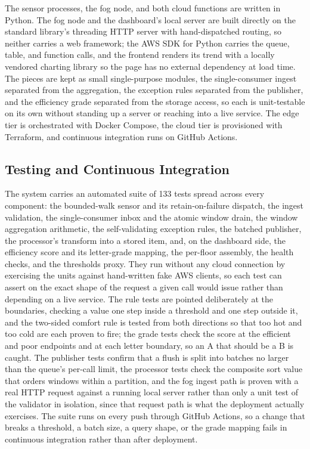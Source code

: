 \documentclass[conference]{IEEEtran}
\begin{document}
The sensor processes, the fog node, and both cloud functions are written in Python. The fog node and the dashboard's local server are built directly on the standard library's threading HTTP server with hand-dispatched routing, so neither carries a web framework; the AWS SDK for Python carries the queue, table, and function calls, and the frontend renders its trend with a locally vendored charting library so the page has no external dependency at load time. The pieces are kept as small single-purpose modules, the single-consumer ingest separated from the aggregation, the exception rules separated from the publisher, and the efficiency grade separated from the storage access, so each is unit-testable on its own without standing up a server or reaching into a live service. The edge tier is orchestrated with Docker Compose, the cloud tier is provisioned with Terraform, and continuous integration runs on GitHub Actions.

\subsection{Testing and Continuous Integration}

The system carries an automated suite of 133 tests spread across every component: the bounded-walk sensor and its retain-on-failure dispatch, the ingest validation, the single-consumer inbox and the atomic window drain, the window aggregation arithmetic, the self-validating exception rules, the batched publisher, the processor's transform into a stored item, and, on the dashboard side, the efficiency score and its letter-grade mapping, the per-floor assembly, the health checks, and the thresholds proxy. They run without any cloud connection by exercising the units against hand-written fake AWS clients, so each test can assert on the exact shape of the request a given call would issue rather than depending on a live service. The rule tests are pointed deliberately at the boundaries, checking a value one step inside a threshold and one step outside it, and the two-sided comfort rule is tested from both directions so that too hot and too cold are each proven to fire; the grade tests check the score at the efficient and poor endpoints and at each letter boundary, so an A that should be a B is caught. The publisher tests confirm that a flush is split into batches no larger than the queue's per-call limit, the processor tests check the composite sort value that orders windows within a partition, and the fog ingest path is proven with a real HTTP request against a running local server rather than only a unit test of the validator in isolation, since that request path is what the deployment actually exercises. The suite runs on every push through GitHub Actions, so a change that breaks a threshold, a batch size, a query shape, or the grade mapping fails in continuous integration rather than after deployment.
\end{document}
